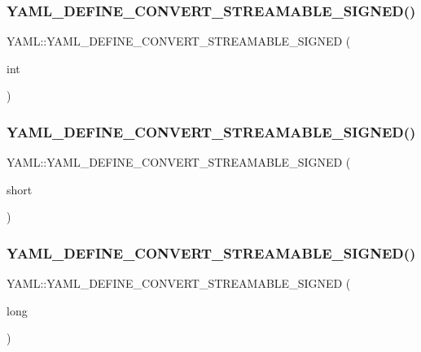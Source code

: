 \subsubsection{\texorpdfstring{YAML\_DEFINE\_CONVERT\_STREAMABLE\_SIGNED()}{YAML\_DEFINE\_CONVERT\_STREAMABLE\_SIGNED()}\hspace{0.1cm}{\footnotesize\ttfamily [1/9]}}
{\footnotesize\ttfamily Y\+A\+M\+L\+::\+Y\+A\+M\+L\+\_\+\+D\+E\+F\+I\+N\+E\+\_\+\+C\+O\+N\+V\+E\+R\+T\+\_\+\+S\+T\+R\+E\+A\+M\+A\+B\+L\+E\+\_\+\+S\+I\+G\+N\+ED (\begin{DoxyParamCaption}\item[{int}]{ }\end{DoxyParamCaption})}

\mbox{\label{namespace_y_a_m_l_a0e73e714546f78997780dac5eb2c0798}} 
\subsubsection{\texorpdfstring{YAML\_DEFINE\_CONVERT\_STREAMABLE\_SIGNED()}{YAML\_DEFINE\_CONVERT\_STREAMABLE\_SIGNED()}\hspace{0.1cm}{\footnotesize\ttfamily [2/9]}}
{\footnotesize\ttfamily Y\+A\+M\+L\+::\+Y\+A\+M\+L\+\_\+\+D\+E\+F\+I\+N\+E\+\_\+\+C\+O\+N\+V\+E\+R\+T\+\_\+\+S\+T\+R\+E\+A\+M\+A\+B\+L\+E\+\_\+\+S\+I\+G\+N\+ED (\begin{DoxyParamCaption}\item[{short}]{ }\end{DoxyParamCaption})}

\mbox{\label{namespace_y_a_m_l_af57faf99be6cc3fd56f519a12132666b}} 
\subsubsection{\texorpdfstring{YAML\_DEFINE\_CONVERT\_STREAMABLE\_SIGNED()}{YAML\_DEFINE\_CONVERT\_STREAMABLE\_SIGNED()}\hspace{0.1cm}{\footnotesize\ttfamily [3/9]}}
{\footnotesize\ttfamily Y\+A\+M\+L\+::\+Y\+A\+M\+L\+\_\+\+D\+E\+F\+I\+N\+E\+\_\+\+C\+O\+N\+V\+E\+R\+T\+\_\+\+S\+T\+R\+E\+A\+M\+A\+B\+L\+E\+\_\+\+S\+I\+G\+N\+ED (\begin{DoxyParamCaption}\item[{long}]{ }\end{DoxyParamCaption})}

